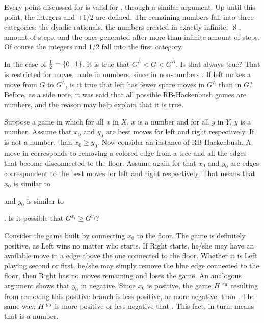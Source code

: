 Every point discussed for  is valid for , through a similar argument. Up until this point, the integers and $\pm 1/2$ are defined. The remaining numbers fall into three categories: the dyadic rationals, the numbers created in exactly infinite, $\aleph$, amount of steps, and the ones generated after more than infinite amount of steps. Of course the integers and 1/2 fall into the first category.

In the case of $\frac{1}{2} = \mbox{$\{0\:|\:1\}$}$, it is true that $G^L < G < G^R$. Is that always true? That is restricted for moves made in numbers, since in non-numbers . If left makes a move from $G$ to $G^L$, is it true that left has fewer spare moves in $G^L$ than in $G$? Before, as a side note, it was said that all possible RB-Hackenbush games are numbers, and the reason may help explain that it is true.

Suppose a game  in which for all $x$ in $X$, $x$  is a number and for all $y$ in $Y$, $y$ is a number. Assume that $x_0$ and $y_0$ are best moves for left and right respectively. If \Gm{} is not a number, than $x_0 \ge y_0$. Now consider \Hm an instance of RB-Hackenbush. A move in \Hm corresponds to removing a colored edge from a tree and all the edges that become disconnected to the floor. Assume again for \Hm that $x_0$ and $y_0$ are edges correspondent to the best moves for left and right respectively. That means that $x_0$ is similar to  
 and $y_0$ is similar to 
. Is it possible that $G^{x_i} \ge G^{y_j}$?

Consider the game built by connecting $x_0$ to the floor. The game is definitely positive, as Left wins no matter who starts. If Right starts, he/she may have an available move in a edge above the one connected to the floor. Whether it is Left playing second or first, he/she may simply remove the blue edge connected to the floor, then Right has no moves remaining and loses the game. An analogous argument shows that $y_0$ in negative. Since $x_0$ is positive, the game $\mbox{$H\,$}^{x_0}$ resulting from removing this positive branch is less positive, or more negative, than \Hm. The same way, $\mbox{$H\,$}^{y_0}$ is more positive or less negative that \Hm. This fact, in turn, means that \Hm is a number.

